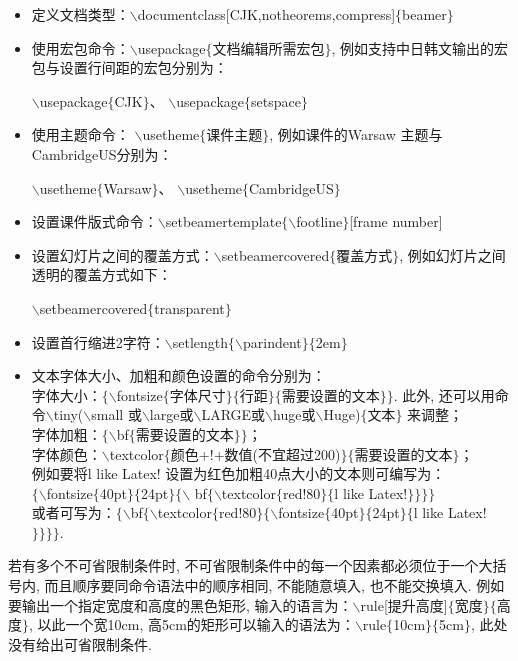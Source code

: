 \begin{itemize}
\item 定义文档类型：$\backslash$documentclass[CJK,notheorems,compress]$\{$beamer$\}$
    \item 使用宏包命令：$\backslash$usepackage$\{$文档编辑所需宏包$\}$, 例如支持中日韩文输出的宏包与设置行间距的宏包分别为：\\
 \centerline{
 $\backslash$usepackage$\{$CJK$\}${}、
 $\backslash$usepackage$\{$setspace$\}$
 }
    \item 使用主题命令：
$\backslash$usetheme$\{$课件主题$\}$, 例如课件的Warsaw 主题与CambridgeUS分别为：\\
\centerline{
$\backslash$usetheme$\{$Warsaw$\}${}、
$\backslash$usetheme$\{$CambridgeUS$\}$}
    \item 设置课件版式命令：$\backslash$setbeamertemplate$\{\backslash$footline$\}$[frame number]
    \item 设置幻灯片之间的覆盖方式：$\backslash$setbeamercovered$\{$覆盖方式$\}$, 例如幻灯片之间透明的覆盖方式如下：\\
    \centerline{
        $\backslash$setbeamercovered$\{$transparent$\}$}
    \item 设置首行缩进2字符：$\backslash$setlength$\{\backslash$parindent$\}\{$2em$\}$
    \item 文本字体大小、加粗和颜色设置的命令分别为：\\
字体大小：$\{\backslash$fontsize$\{$字体尺寸$\}\{$行距$\}\{$需要设置的文本$\}\}$. 此外, 还可以用命令$\backslash$tiny($\backslash$small 或$\backslash$large或$\backslash$LARGE或$\backslash$huge或$\backslash$Huge)$\{$文本$\}$ 来调整；\\
字体加粗：$\{\backslash$bf$\{$需要设置的文本$\}\}$；\\
字体颜色：$\backslash$textcolor$\{$颜色+!+数值(不宜超过200)$\} \{$需要设置的文本$\}$；\\
例如要将l like Latex! 设置为红色加粗40点大小的文本则可编写为：\\
$\{\backslash$fontsize$\{$40pt$\}\{$24pt$\}\{\backslash$ bf$\{\backslash$textcolor$\{$red!80$\}\{$l like Latex!$\}\}\}\}$\\
\noindent 或者可写为：$\{\backslash$bf$\{\backslash$textcolor$\{$red!80$\}\{\backslash$fontsize$\{$40pt$\}\{$24pt$\}\{$l like Latex!$\}\}\}\}$.
    \end{itemize}


若有多个不可省限制条件时, 不可省限制条件中的每一个因素都必须位于一个大括号内, 而且顺序要同命令语法中的顺序相同, 不能随意填入, 也不能交换填入. 例如要输出一个指定宽度和高度的黑色矩形, 输入的语言为：$\backslash$rule[提升高度]$\{$宽度$\}\{$高度$\}$, 以此一个宽10cm, 高5cm的矩形可以输入的语法为：$\backslash$rule$\{$10cm$\}\{$5cm$\}$, 此处没有给出可省限制条件.


